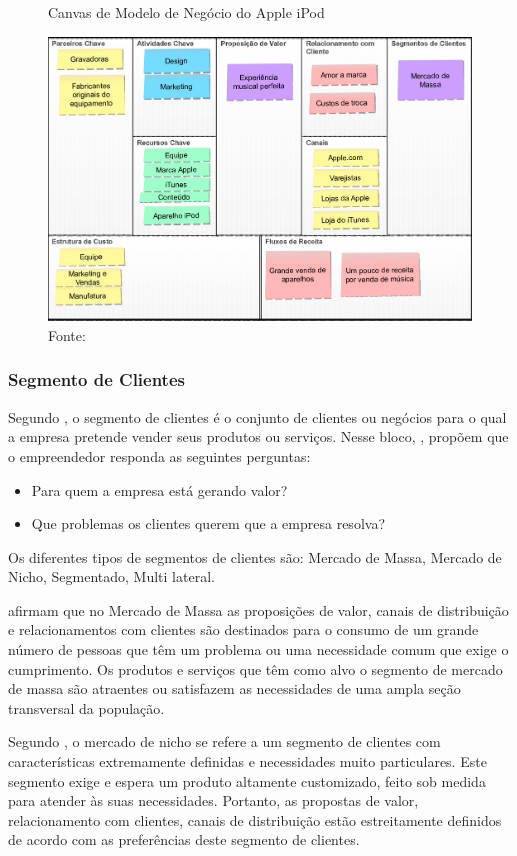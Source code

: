 \begin{figure}[H]
\caption{Canvas de Modelo de Negócio do Apple iPod}
\centerline{\includegraphics[scale=0.25]{img/canvas_ipod}}
\label{fig:canvas_ipod}
\caption* {Fonte: }
\end{figure}

\subsubsection{Segmento de Clientes}
\label{cha:segmento_de_clientes}
Segundo , o segmento de clientes é o conjunto de clientes ou negócios para o qual a empresa pretende vender seus produtos ou serviços.
Nesse bloco, , propõem que o empreendedor responda as seguintes perguntas:
\begin{itemize}
\item Para quem a empresa está gerando valor?
\item Que problemas os clientes querem que a empresa resolva?
\end{itemize}
Os diferentes tipos de segmentos de clientes são: Mercado de Massa, Mercado de Nicho, Segmentado, Multi lateral.

 afirmam que no Mercado de Massa as proposições de valor, canais de distribuição e relacionamentos com clientes são destinados para o consumo de um grande número de pessoas que têm um problema ou uma necessidade comum que exige o cumprimento. Os produtos e serviços que têm como alvo o segmento de mercado de massa são atraentes ou satisfazem as necessidades de uma ampla seção transversal da população.

Segundo , o mercado de nicho se refere a um segmento de clientes com características extremamente definidas e necessidades muito particulares. Este segmento exige e espera um produto altamente customizado, feito sob medida para atender às suas necessidades. Portanto, as propostas de valor, relacionamento com clientes, canais de distribuição estão estreitamente definidos de acordo com as preferências deste segmento de clientes.

